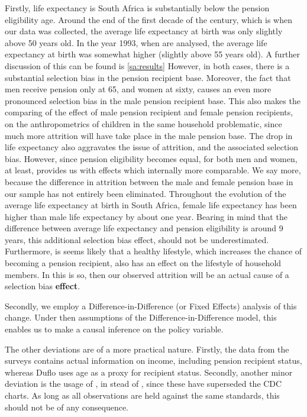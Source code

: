 \begin{refsection}
Firstly, life expectancy is South Africa is substantially below the pension eligibility age.
Around the end of the first decade of the century, which is when our data was collected,
the average life expectancy at birth was only slightly above 50 years old.
In the year 1993, when \textcite{duflo2000child,duflo2003grandmothers} are analysed,
the average life expectancy at birth was somewhat higher (slightly above 55 years old).
A further discussion of this can be found is \autoref{sa:results}
However, in both cases, there is a substantial selection bias in the pension recipient base.
Moreover, the fact that men receive pension only at 65, and women at sixty,
causes an even more pronounced selection bias in the male pension recipient base.
This also makes the comparing of the effect of male pension recipient and female pension recipients,
on the anthropometrics of children in the same household problematic,
since much more attrition will have take place in the male pension base.
The drop in life expectancy also aggravates the issue of attrition,
and the associated selection bias.
However, since pension eligibility becomes equal, for both men and women, at least,
provides us with effects which internally more comparable.
We say more, because the difference in attrition between the male and female pension base in our sample has not entirely been eliminated.
Throughout the evolution of the average life expectancy at birth in South Africa,
female life expectancy has been higher than male life expectancy by about one year.
Bearing in mind that the difference between average life expectancy and pension eligibility is around 9 years,
this additional selection bias effect, should not be underestimated.
Furthermore, is seems likely that a healthy lifestyle, which increases the chance of becoming a pension recipient,
also has an effect on the lifestyle of household members.
In this is so, then our observed attrition will be an actual cause of a selection bias \textbf{effect}.


Secondly, we employ a Difference-in-Difference (or Fixed Effects) analysis of this change.
Under then assumptions of the Difference-in-Difference model,
this enables us to make a causal inference on the policy variable.

The other deviations are of a more practical nature.
Firstly, the data from the \textcite{saldru2008nids,saldru2012nids,saldru2013nids} surveys contains actual information on income,
including pension recipient status, whereas Duflo uses age as a proxy for recipient status.
Secondly, another minor deviation is the usage of \textcite[WHO Child Growth Standards]{who2006child},
in stead of \textcite[CDC Growth Charts: United States]{nchs2000cdc}, since these have superseded the CDC charts.
As long as all observations are held against the same standards, this should not be of any consequence.


\end{refsection}
